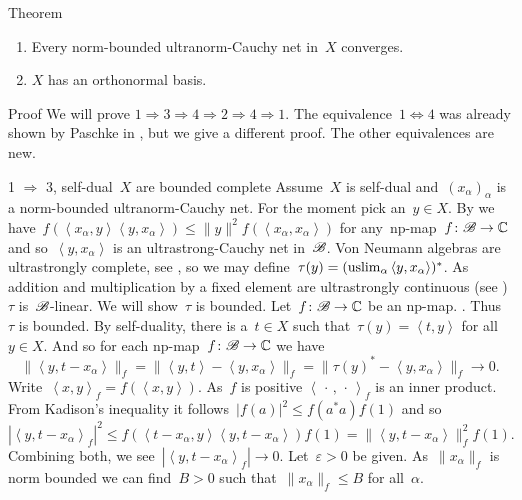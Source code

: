 \documentclass[b]{subfiles}
\begin{document}
\begin{parsec}
\begin{point}{Theorem}
\begin{enumerate}
            \item Every norm-bounded ultranorm-Cauchy net in~$X$ converges.
            \item $X$ has an orthonormal basis.
        \end{enumerate}
\begin{point}{Proof}%
We will prove $1 \Rightarrow 3 \Rightarrow 4 \Rightarrow 2 \Rightarrow 4 \Rightarrow 1$.
The equivalence~$1 \Leftrightarrow 4$
    was already shown by Paschke in \cite[Thm.~3.12]{paschke},
    but we give a different proof. The other equivalences are new.
\begin{point}{1 $\Rightarrow$ 3, self-dual~$X$ are bounded complete}%
    Assume~$X$ is self-dual and~$(x_\alpha)_\alpha$
        is a norm-bounded ultranorm-Cauchy net.
     For the moment pick an~$y \in X$.
By  we
    have~$f(\left<x_\alpha,y\right>\left<y,x_\alpha\right>) \leq \|y\|^2
        f(\left<x_\alpha,x_\alpha\right>)$ for any~np-map~$f\colon \mathscr{B} \to \mathbb{C}$
        and so~$\left<y,x_\alpha\right>$ is an ultrastrong-Cauchy net in~$\mathscr{B}$.
Von Neumann algebras are ultrastrongly complete, see ,
so we may define~$\tau(y) = (\uslim_\alpha \left<y, x_\alpha\right>)^*$.
As addition and multiplication by a fixed element
are ultrastrongly continuous (see )
    $\tau$ is~$\mathscr{B}$-linear.
We will show~$\tau$ is bounded.
Let~$f\colon \mathscr{B} \to \mathbb{C}$ be an np-map.
.
Thus~$\tau$ is bounded.
By self-duality, there is a~$t \in X$ such that~$\tau(y) = \left<t,y\right>$
for all~$y \in X$.
And so for each np-map~$f\colon \mathscr{B} \to \mathbb{C}$ we have
\begin{equation*}
    \|\left<y, t-x_\alpha\right>\|_f=
    \|\left<y, t\right>-\left<y,x_\alpha\right>\|_f=
    \|\tau(y)^*-\left<y,x_\alpha\right>\|_f \rightarrow 0.
\end{equation*}
Write~$\left<x,y\right>_f=f(\left<x,y\right>)$.
As~$f$ is positive $\left<\,\cdot\,,\,\cdot\,\right>_f$ is an inner product.
From Kadison's inequality 
it follows~$|f(a)|^2 \leq f(a^*a)f(1)$
and so
\begin{equation*}
    |\left<y,t-x_\alpha\right>_f|^2
    \leq f( \left<t-x_\alpha,y\right> \left<y,t-x_\alpha\right>) f(1)
    = \| \left<y,t-x_\alpha\right> \|_f^2 f(1).
\end{equation*}
Combining both, we see~$|\left<y,t-x_\alpha\right>_f| \rightarrow 0$.
Let~$\varepsilon > 0$ be given.
As~$\|x_\alpha\|_f$ is norm bounded
we can find~$B > 0$ such that~$\|x_\alpha\|_f \leq B$
for all~$\alpha$.

\end{point}
\end{point}
\end{point}
\end{parsec}
\end{document}
